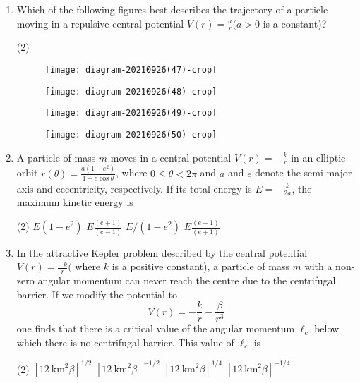 \begin{enumerate}
	\item Which of the following figures best describes the trajectory of a particle moving in a repulsive central potential $V(r)=\frac{a}{r}(a>0$ is a constant)?
	{}
\begin{tasks}(2)
	\task[\textbf{A.}]\begin{figure}[H]
		\centering
		\texttt{[image: diagram-20210926(47)-crop]}
	\end{figure}
	\task[\textbf{B.}]\begin{figure}[H]
		\centering
		\texttt{[image: diagram-20210926(48)-crop]}
	\end{figure}
	\task[\textbf{C.}]\begin{figure}[H]
		\centering
		\texttt{[image: diagram-20210926(49)-crop]}
	\end{figure}
	\task[\textbf{D.}]\begin{figure}[H]
		\centering
		\texttt{[image: diagram-20210926(50)-crop]}
	\end{figure}
\end{tasks}
	\item A particle of mass $m$ moves in a central potential $V(r)=-\frac{k}{r}$ in an elliptic orbit $r(\theta)=\frac{a\left(1-e^{2}\right)}{1+e \cos \theta}$, where $0 \leq \theta<2 \pi$ and $a$ and $e$ denote the semi-major axis and eccentricity, respectively. If its total energy is $E=-\frac{k}{2 a}$, the maximum kinetic energy is
	{}
\begin{tasks}(2)
	\task[\textbf{A.}] $E\left(1-e^{2}\right)$
	\task[\textbf{B.}]$E \frac{(e+1)}{(e-1)}$
	\task[\textbf{C.}]$E /\left(1-e^{2}\right)$
	\task[\textbf{D.}]$E \frac{(e-1)}{(e+1)}$
\end{tasks}
	\item In the attractive Kepler problem described by the central potential $V(r)=\frac{-k}{r}($ where $k$ is a positive constant), a particle of mass $m$ with a non-zero angular momentum can never reach the centre due to the centrifugal barrier. If we modify the potential to
	$$
	V(r)=-\frac{k}{r}-\frac{\beta}{r^{3}}
	$$
	one finds that there is a critical value of the angular momentum $\ell_{c}$ below which there is no centrifugal barrier. This value of $\ell_{c}$ is
	{}
\begin{tasks}(2)
	\task[\textbf{A.}] $\left[12 \mathrm{~km}^{2} \beta\right]^{1 / 2}$
	\task[\textbf{B.}]$\left[12 \mathrm{~km}^{2} \beta\right]^{-1 / 2}$
	\task[\textbf{C.}]$\left[12 \mathrm{~km}^{2} \beta\right]^{1 / 4}$
	\task[\textbf{D.}]$\left[12 \mathrm{~km}^{2} \beta\right]^{-1 / 4}$
\end{tasks}
 \end{enumerate}
